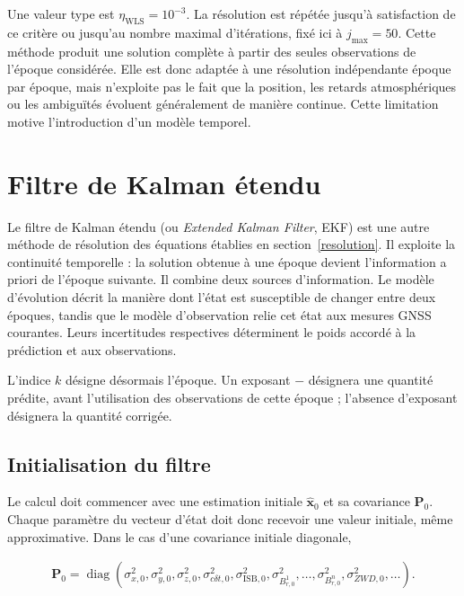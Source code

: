 Une valeur type est $\eta_{\mathrm{WLS}}=10^{-3}$. La résolution est répétée
jusqu'à satisfaction de ce critère ou jusqu'au nombre maximal d'itérations,
fixé ici à $j_{\max}=50$. Cette méthode produit une
solution complète à partir des seules observations de l'époque considérée.
Elle est donc adaptée à une résolution indépendante époque par époque, mais
n'exploite pas le fait que la position, les retards atmosphériques ou les
ambiguïtés évoluent généralement de manière continue. Cette limitation motive
l'introduction d'un modèle temporel.

\section{Filtre de Kalman étendu }
\label{Kalman}

Le filtre de Kalman étendu (ou \emph{Extended Kalman Filter}, EKF) est une autre méthode de résolution des équations établies en section~\ref{resolution}.
Il exploite la continuité temporelle : la solution
obtenue à une époque devient l'information a priori de l'époque suivante. Il
combine deux sources d'information. Le modèle d'évolution décrit la manière
dont l'état est susceptible de changer entre deux époques, tandis que le modèle
d'observation relie cet état aux mesures GNSS courantes. Leurs incertitudes
respectives déterminent le poids accordé à la prédiction et aux observations.

L'indice $k$
désigne désormais l'époque. Un exposant $-$ désignera une quantité prédite,
avant l'utilisation des observations de cette époque ; l'absence d'exposant
désignera la quantité corrigée.

\subsection{Initialisation du filtre}
\label{sec:ekf_initialization}

Le calcul doit commencer avec une estimation initiale
$\widehat{\mathbf x}_0$ et sa covariance $\mathbf P_0$. Chaque paramètre du
vecteur d'état doit donc recevoir une valeur initiale, même approximative. Dans
le cas d'une covariance initiale diagonale,

\begin{align}
\mathbf P_0
=
\operatorname{diag}
\left(
\sigma_{x,0}^2,
\sigma_{y,0}^2,
\sigma_{z,0}^2,
\sigma_{c\delta t,0}^2,
\sigma_{\mathrm{ISB},0}^2,
\sigma_{B_{r,0}^1}^2,\ldots,
\sigma_{B_{r,0}^n}^2,
\sigma_{ZWD,0}^2,\ldots
\right).
\label{eq:ekf_initial_covariance}
\end{align}

